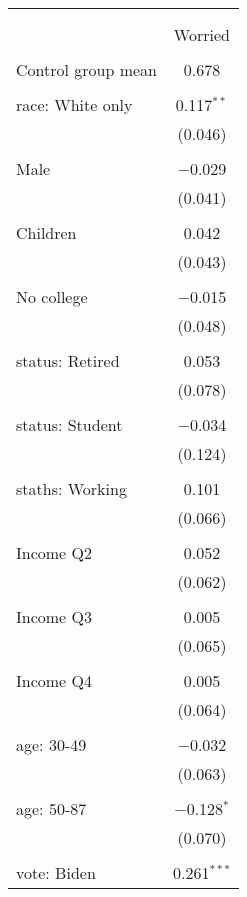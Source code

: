
\begin{tabular}{@{\extracolsep{5pt}}lc} 
\\[-1.8ex]\hline 
\hline \\[-1.8ex] 
\\[-1.8ex] & Worried \\ 
\hline \\[-1.8ex] 
 Control group mean & 0.678  \\ \hline \\[-1.8ex] race: White only & 0.117$^{**}$ \\ 
  & (0.046) \\ 
  & \\ 
 Male & $-$0.029 \\ 
  & (0.041) \\ 
  & \\ 
 Children & 0.042 \\ 
  & (0.043) \\ 
  & \\ 
 No college & $-$0.015 \\ 
  & (0.048) \\ 
  & \\ 
 status: Retired & 0.053 \\ 
  & (0.078) \\ 
  & \\ 
 status: Student & $-$0.034 \\ 
  & (0.124) \\ 
  & \\ 
 staths: Working & 0.101 \\ 
  & (0.066) \\ 
  & \\ 
 Income Q2 & 0.052 \\ 
  & (0.062) \\ 
  & \\ 
 Income Q3 & 0.005 \\ 
  & (0.065) \\ 
  & \\ 
 Income Q4 & 0.005 \\ 
  & (0.064) \\ 
  & \\ 
 age: 30-49 & $-$0.032 \\ 
  & (0.063) \\ 
  & \\ 
 age: 50-87 & $-$0.128$^{*}$ \\ 
  & (0.070) \\ 
  & \\ 
 vote: Biden & 0.261$^{***}$ \\ 

\end{tabular}
